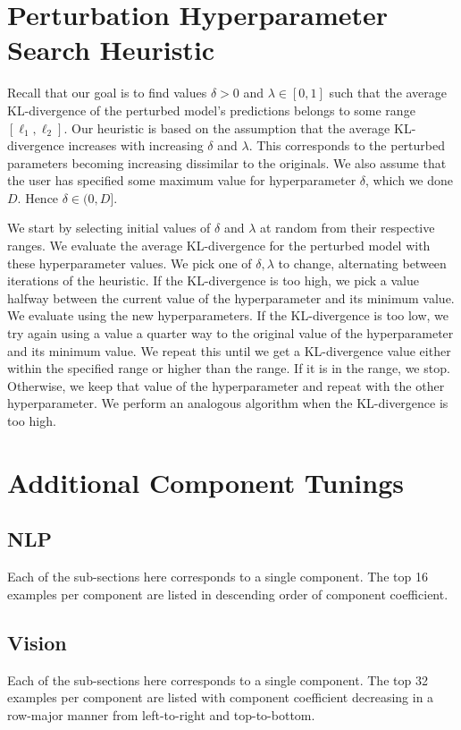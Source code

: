 \documentclass[dvipsnames]{article}
\begin{document}
\section{Perturbation Hyperparameter Search Heuristic}\label{sec:hyperparameter_heuristic}
Recall that our goal is to find values $\delta > 0$ and $\lambda \in [0, 1]$ such that the average KL-divergence of the perturbed model's predictions belongs to some range $[\ell_1, \ell_2]$.
Our heuristic is based on the assumption that the average KL-divergence increases with increasing $\delta$ and $\lambda$.
This corresponds to the perturbed parameters becoming increasing dissimilar to the originals.
We also assume that the user has specified some maximum value for hyperparameter $\delta$, which we done $D$.
Hence $\delta \in (0, D]$.

We start by selecting initial values of $\delta$ and $\lambda$ at random from their respective ranges.
We evaluate the average KL-divergence for the perturbed model with these hyperparameter values.
We pick one of $\delta,\lambda$ to change, alternating between iterations of the heuristic.
If the KL-divergence is too high, we pick a value halfway between the current value of the hyperparameter and its minimum value.
We evaluate using the new hyperparameters.
If the KL-divergence is too low, we try again using a value a quarter way to the original value of the hyperparameter and its minimum value.
We repeat this until we get a KL-divergence value either within the specified range or higher than the range.
If it is in the range, we stop.
Otherwise, we keep that value of the hyperparameter and repeat with the other hyperparameter.
We perform an analogous algorithm when the KL-divergence is too high.

\section{Additional Component Tunings}\label{sec:additional_tunings}

\subsection{NLP}
Each of the sub-sections here corresponds to a single component.
The top 16 examples per component are listed in descending order of component coefficient.



\subsection{Vision}
Each of the sub-sections here corresponds to a single component.
The top 32 examples per component are listed with component coefficient decreasing in a row-major manner from left-to-right and top-to-bottom.
\end{document}

